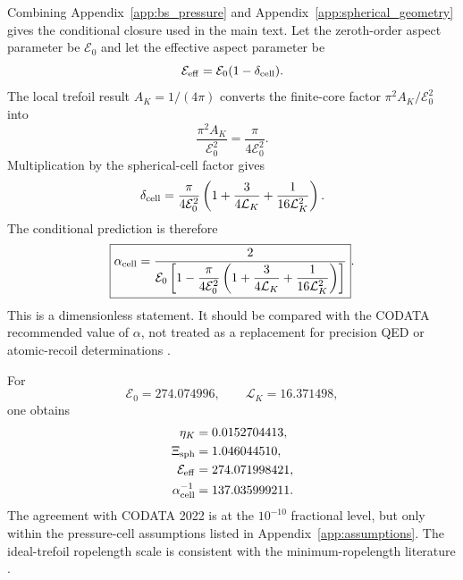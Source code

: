 \documentclass[aps,pra,preprint,longbibliography,nofootinbib]{revtex4-2}
\begin{document}
Combining Appendix~\ref{app:bs_pressure} and
Appendix~\ref{app:spherical_geometry} gives the conditional closure used in
the main text.  Let the zeroth-order aspect parameter be $\mathcal E_0$ and
let the effective aspect parameter be
\begin{equation}
  \mathcal E_{\rm eff}=\mathcal E_0(1-\delta_{\rm cell}) .
  \label{eq:app_E_eff_def}
\end{equation}
The local trefoil result $A_K=1/(4\pi)$ converts the finite-core factor
$\pi^2A_K/\mathcal E_0^2$ into
\begin{equation}
  \frac{\pi^2A_K}{\mathcal E_0^2}=\frac{\pi}{4\mathcal E_0^2} .
  \label{eq:app_pi_over_four}
\end{equation}
Multiplication by the spherical-cell factor gives
\begin{equation}
  \delta_{\rm cell}
  =\frac{\pi}{4\mathcal E_0^2}
   \left(1+\frac{3}{4\mathcal L_K}+\frac{1}{16\mathcal L_K^2}\right).
  \label{eq:app_delta_cell}
\end{equation}
The conditional prediction is therefore
\begin{equation}
  \boxed{\alpha_{\rm cell}
  =\frac{2}{\mathcal E_0\left[1-
  \dfrac{\pi}{4\mathcal E_0^2}\left(1+\dfrac{3}{4\mathcal L_K}
  +\dfrac{1}{16\mathcal L_K^2}\right)\right]}} .
  \label{eq:app_alpha_cell}
\end{equation}
This is a dimensionless statement.  It should be compared with the CODATA
recommended value of $\alpha$, not treated as a replacement for precision
QED or atomic-recoil determinations \cite{MohrTaylor2022,Karshenboim2005}.

For
\begin{equation}
  \mathcal E_0=274.074996,
  \qquad
  \mathcal L_K=16.371498,
  \label{eq:app_numerical_inputs}
\end{equation}
one obtains
\begin{align}
  \eta_K &= 0.0152704413,\nonumber\\
  \Xi_{\rm sph} &= 1.046044510,\nonumber\\
  \mathcal E_{\rm eff} &= 274.071998421,\nonumber\\
  \alpha_{\rm cell}^{-1} &= 137.035999211 .
  \label{eq:app_numerical_alpha}
\end{align}
The agreement with CODATA 2022 is at the $10^{-10}$ fractional level, but
only within the pressure-cell assumptions listed in
Appendix~\ref{app:assumptions}.  The ideal-trefoil ropelength scale is
consistent with the minimum-ropelength literature \cite{Cantarella2002}.
\end{document}
